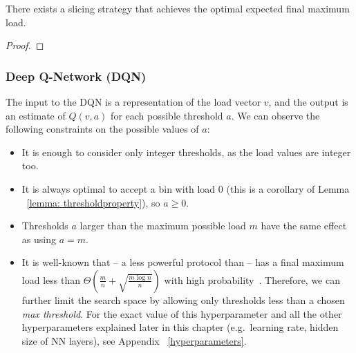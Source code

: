\begin{lemma} \label{lemma: thresholdproperty}
There exists a slicing strategy that achieves the optimal expected final maximum load.
\end{lemma}


\begin{proof}
\end{proof}



\subsubsection{Deep Q-Network (DQN)} \label{DQN}

The input to the DQN is a representation of the load vector $v$, and the output is an estimate of $Q(v, a)$ for each possible threshold $a$. We can observe the following constraints on the possible values of $a$:

\begin{itemize}
    \item It is enough to consider only integer thresholds, as the load values are integer too.
    \item It is always optimal to accept a bin with load $0$ (this is a corollary of Lemma ~\ref{lemma: thresholdproperty}), so $a\geq 0$.
    \item Thresholds $a$ larger than the maximum possible load $m$ have the same effect as using $a=m$.
    \item It is well-known that \OneChoice -- a less powerful protocol than \TwoThinning -- has a final maximum load less than $\Theta (\frac{m}{n} + \sqrt{\frac{m\log n}{n}})$ with high probability~\cite{raab1998onechoice}. Therefore, we can further limit the search space by allowing only thresholds less than a chosen \textit{max threshold}. For the exact value of this hyperparameter and all the other hyperparameters explained later in this chapter (e.g.\ learning rate, hidden size of NN layers), see Appendix ~\ref{hyperparameters}. 
    
\end{itemize}


